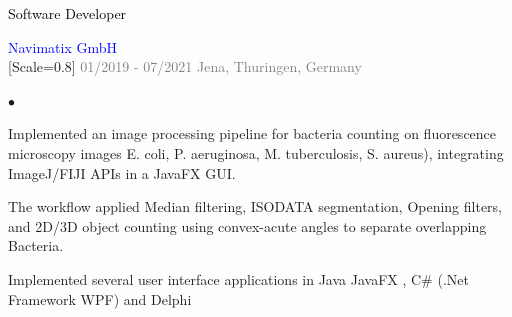 
\vspace{0.7em}

{\setmainfont{Rubik Medium}\fontsize{10}{14}\selectfont\textcolor{black}{Software Developer}}

{\setmainfont{Rubik Medium}\fontsize{10}{14}\selectfont\textcolor{blue}{Navimatix GmbH}}\\[-6pt]

{[Scale=0.8]
\textcolor{gray}{
\faCalendar\hspace{4pt}01/2019 - 07/2021\hspace{1.5em}
\faMapMarker*\hspace{4pt}Jena, Thuringen, Germany
}}\\[-10pt]

{\setmainfont{Rubik Light}\fontsize{10}{13}\selectfont
\color{gray}
\begin{list}{$\bullet$}{
  \setlength{\topsep}{2pt}        %
  \setlength{\itemsep}{2pt}       %
  \setlength{\parsep}{0pt}
  \setlength{\parskip}{0pt}
  \setlength{\leftmargin}{12pt}   %
  \setlength{\labelsep}{4pt}      %
}
  \item Implemented an image processing pipeline for bacteria counting on 
fluorescence microscopy images  E. coli, P. aeruginosa, M. tuberculosis, S. aureus), integrating ImageJ/FIJI APIs in a JavaFX GUI.
  \item The workflow applied Median filtering, ISODATA segmentation, Opening filters, and 2D/3D object counting using convex-acute angles to separate overlapping Bacteria.
  \item Implemented several user interface applications in Java  JavaFX , C\# 
(.Net Framework WPF) and Delphi
\end{list}
}

